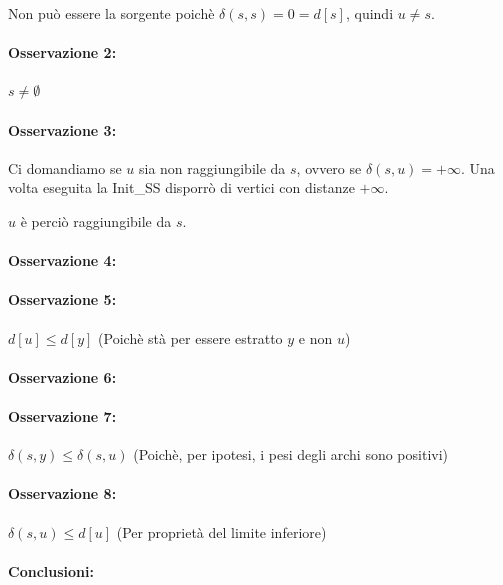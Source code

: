 \documentclass[11pt,a4paper,twoside,openright]{book}
\let\oldparagraph\paragraph
\renewcommand{\paragraph}[1]{\oldparagraph{#1}\mbox{}}
\begin{document}
{{{Non può essere la sorgente poichè $\delta(s,s)=0=d[s]$, quindi $u\neq s$.}

\paragraph{Osservazione 2:}

$s \neq \emptyset$

\paragraph{Osservazione 3:}

Ci domandiamo se $u$ sia non raggiungibile da $s$, ovvero se $\delta(s,u)=+\infty$.
Una volta eseguita la Init\_SS disporrò di vertici con distanze $+\infty$.

$u$ è perciò raggiungibile da $s$.

\paragraph{Osservazione 4:}

\paragraph{Osservazione 5:}

$d[u] \leq d[y]$ (Poichè stà per essere estratto $y$ e non $u$)

\paragraph{Osservazione 6:}

\paragraph{Osservazione 7:}

$\delta(s,y) \leq \delta(s,u)$ (Poichè, per ipotesi, i pesi degli archi sono positivi)

\paragraph{Osservazione 8:}

$\delta(s,u) \leq d[u]$ (Per proprietà del limite inferiore)

\paragraph{Conclusioni:}

}}
\end{document}
